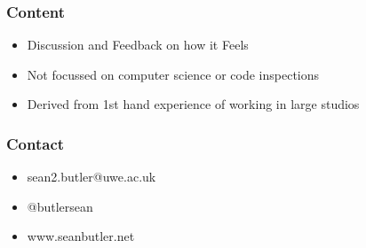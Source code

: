 \documentclass{beamer}
\begin{document}
\begin{frame}
    \frametitle{Content}
    \begin{itemize}
        \item Discussion and Feedback on how it Feels
        \item Not focussed on computer science or code inspections
        \item Derived from 1st hand experience of working in large studios
    \end{itemize}
\end{frame}

\begin{frame}
    \frametitle{Contact}
    \begin{itemize}
        \item sean2.butler@uwe.ac.uk
        \item @butlersean
        \item www.seanbutler.net
    \end{itemize}
\end{frame}
\end{document}
